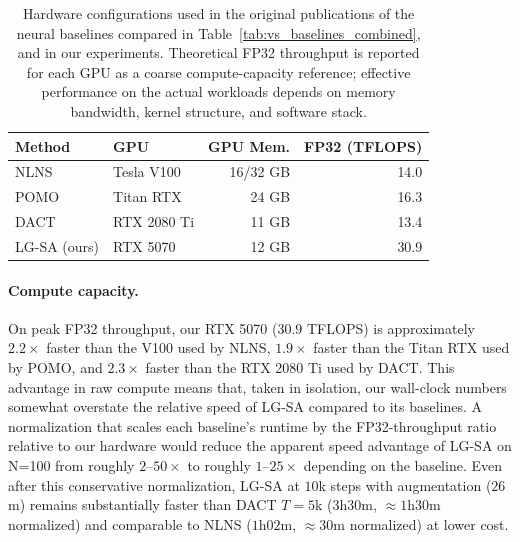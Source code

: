 \documentclass[letterpaper]{article} %
\begin{document}
\begin{table}[h]
\centering
\small
\setlength{\tabcolsep}{6pt}
\caption{Hardware configurations used in the original publications of the neural baselines compared in Table~\ref{tab:vs_baselines_combined}, and in our experiments. Theoretical FP32 throughput is reported for each GPU as a coarse compute-capacity reference; effective performance on the actual workloads depends on memory bandwidth, kernel structure, and software stack.}
\label{tab:hardware_setup}
\begin{tabular}{@{}l l r r@{}}
\toprule
Method & GPU  & GPU Mem. & FP32 (TFLOPS) \\
\midrule
NLNS \citep{hottung_neural_2022} & Tesla V100 & 16/32 GB & 14.0 \\
POMO \citep{kwon_pomo_2021} & Titan RTX & 24 GB & 16.3 \\
DACT \citep{ma_learning_2021} & RTX 2080 Ti & 11 GB & 13.4 \\
LG-SA (ours) & RTX 5070 & 12 GB & 30.9 \\
\bottomrule
\end{tabular}
\end{table}

\paragraph{Compute capacity.}
On peak FP32 throughput, our RTX 5070 ($30.9$ TFLOPS) is approximately $2.2\times$ faster than the V100 used by NLNS, $1.9\times$ faster than the Titan RTX used by POMO, and $2.3\times$ faster than the RTX 2080 Ti used by DACT. This advantage in raw compute means that, taken in isolation, our wall-clock numbers somewhat overstate the relative speed of LG-SA compared to its baselines. A normalization that scales each baseline's runtime by the FP32-throughput ratio relative to our hardware would reduce the apparent speed advantage of LG-SA on N=100 from roughly $2$--$50\times$ to roughly $1$--$25\times$ depending on the baseline. Even after this conservative normalization, LG-SA at $10$k steps with augmentation ($26$m) remains substantially faster than DACT $T{=}5$k ($3$h$30$m, $\approx 1$h$30$m normalized) and comparable to NLNS ($1$h$02$m, $\approx 30$m normalized) at lower cost.
\end{document}
